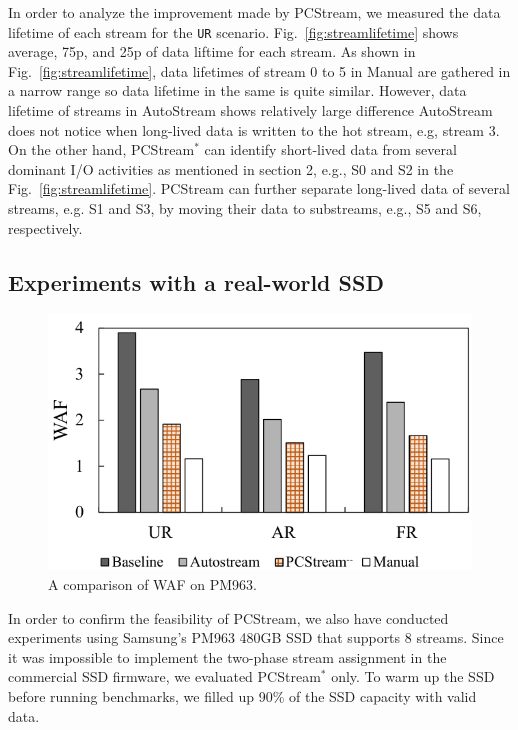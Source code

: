 In order to analyze the improvement made by {\sf PCStream}, 
we measured the data lifetime of each stream for the {\tt UR} scenario.
Fig.~\ref{fig:streamlifetime} shows average, 75p, and 25p of data liftime 
for each stream.
As shown in Fig.~\ref{fig:streamlifetime}, data lifetimes of stream 0 to 5
in \textsf{Manual} are gathered in a narrow range so data lifetime in
the same is quite similar.
However, data lifetime of streams in \textsf{AutoStream} shows relatively large difference
\textsf{AutoStream} does not notice when long-lived data is written to
the hot stream, e.g, stream 3.
On the other hand, {\sf PCStream$^*$} can identify short-lived data from 
several dominant I/O activities as mentioned 
in section 2, e.g., S0 and S2 in the Fig.~\ref{fig:streamlifetime}.
\textsf{PCStream} can further separate long-lived data of several streams, e.g. S1 and S3, 
by moving their data to substreams, e.g., S5 and S6, respectively. 

\vspace{-10pt}
\subsection{Experiments with a real-world SSD}

\begin{figure}[t]
	\centering
	\includegraphics[width=0.8\linewidth]{figure/result_ssd}
	\vspace{-10pt}
	\caption{A comparison of WAF on PM963.}
	\label{fig:result_SSD}
	\vspace{-15pt}
\end{figure}

In order to confirm the feasibility of \textsf{PCStream}, we also have
conducted experiments using Samsung's PM963 480GB SSD that supports 8 streams.
Since it was impossible to implement the two-phase stream assignment in the
commercial SSD firmware, we evaluated {\sf PCStream$^*$} only.  To warm up the
SSD before running benchmarks, we filled up 90\% of the SSD capacity with valid
data.

